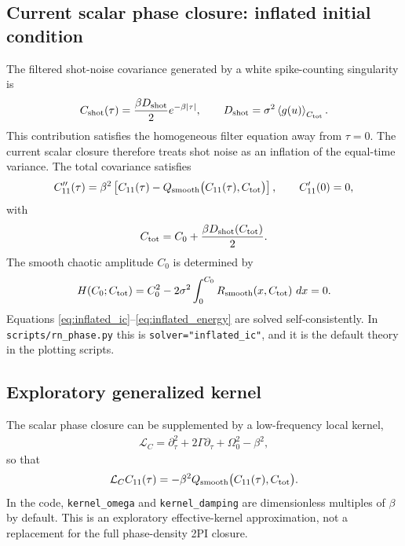 \documentclass[pre,preprint,preprintnumbers,aps,eqsecnum,superscriptaddress,notitlepage,showpacs,floatfix]{revtex4-1}
\newcommand{\dd}{\,d}
\newcommand{\avg}[1]{\left\langle #1 \right\rangle}
\begin{document}
\subsection{Current scalar phase closure: inflated initial condition}

The filtered shot-noise covariance generated by a white spike-counting
singularity is
\begin{align}
C_{\rm shot}(\tau)
=
\frac{\beta D_{\rm shot}}{2}e^{-\beta|\tau|},
\qquad
D_{\rm shot}
=
\sigma^2\avg{g(u)}_{C_{\rm tot}}.
\label{eq:Cshot_filtered}
\end{align}
This contribution satisfies the homogeneous filter equation away from
$\tau=0$.  The current scalar closure therefore treats shot noise as an
inflation of the equal-time variance.  The total covariance satisfies
\begin{align}
C_{11}''(\tau)
=
\beta^2\left[
C_{11}(\tau)-Q_{\rm smooth}\bigl(C_{11}(\tau),C_{\rm tot}\bigr)
\right],
\qquad
C_{11}'(0)=0,
\label{eq:inflated_ic_ode}
\end{align}
with
\begin{align}
C_{\rm tot}
=
C_0+\frac{\beta D_{\rm shot}(C_{\rm tot})}{2}.
\label{eq:inflated_ic}
\end{align}
The smooth chaotic amplitude $C_0$ is determined by
\begin{align}
H(C_0;C_{\rm tot})
=
C_0^2-2\sigma^2\int_0^{C_0}R_{\rm smooth}(x,C_{\rm tot})\,\dd x=0.
\label{eq:inflated_energy}
\end{align}
Equations \eqref{eq:inflated_ic}--\eqref{eq:inflated_energy} are solved
self-consistently.  In \texttt{scripts/rn\_phase.py} this is
\texttt{solver="inflated\_ic"}, and it is the default theory in the plotting
scripts.

\subsection{Exploratory generalized kernel}

The scalar phase closure can be supplemented by a low-frequency local kernel,
\begin{align}
\mathcal L_C
=
\partial_\tau^2+2\Gamma\partial_\tau+\Omega_0^2-\beta^2,
\label{eq:local_kernel}
\end{align}
so that
\begin{align}
\mathcal L_CC_{11}(\tau)
=
-\beta^2Q_{\rm smooth}\bigl(C_{11}(\tau),C_{\rm tot}\bigr).
\label{eq:local_kernel_equation}
\end{align}
In the code, \texttt{kernel\_omega} and \texttt{kernel\_damping} are
dimensionless multiples of $\beta$ by default.  This is an exploratory
effective-kernel approximation, not a replacement for the full phase-density
2PI closure.
\end{document}
